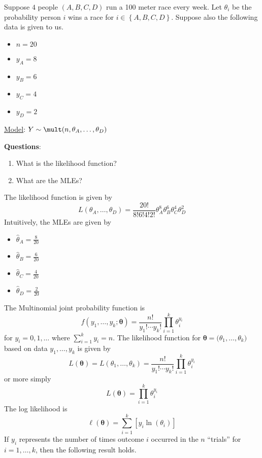 \begin{Example}{}{}
    Suppose $ 4 $ people $ (A,B,C,D) $ run a 100 meter race every week.
    Let $ \theta_i $ be the probability person $ i $ wins a race for
    $ i\in\left\{ A,B,C,D\right\} $.
    Suppose also the following data is given to us.
    \begin{itemize}
        \item $ n=20 $
        \item $ y_A=8 $
        \item $ y_B=6 $
        \item $ y_C=4 $
        \item $ y_D=2 $
    \end{itemize}
    \underline{Model}: $ Y \sim \mult(n,\theta_A,\ldots ,\theta_D) $

    \textbf{Questions}:
    \begin{enumerate}[label=(\alph*)]
        \item What is the likelihood function?
        \item What are the MLEs?
    \end{enumerate}
    The likelihood function is given by
    \[ L(\theta_A,\ldots ,\theta_D)=\frac{20!}{8!6!4!2!} \theta_A^8\theta_B^6\theta_C^4\theta_D^2 \]
    Intuitively, the MLEs are given by
    \begin{itemize}
        \item $ \hat{\theta}_A=\frac{8}{20} $
        \item $ \hat{\theta}_B=\frac{6}{20} $
        \item $ \hat{\theta}_C=\frac{4}{20} $
        \item $ \hat{\theta}_D=\frac{2}{20} $
    \end{itemize}
\end{Example}


The Multinomial joint probability function is
\[ f(y_1,\ldots ,y_k;\symbf{\theta})=\frac{n!}{y_1!\cdots y_k!}\prod_{i=1}^k \theta_i^{y_i} \]
for $ y_i=0,1,\ldots $ where $ \sum\limits_{i=1}^{k} y_i = n $.
The likelihood function for $ \symbf{\theta}=\symbf(\theta_1,\ldots ,\theta_k) $ based on data
$ y_1,\ldots ,y_k $ is given by
\[ L(\symbf{\theta})=L(\theta_1,\ldots ,\theta_k)=\frac{n!}{y_1!\cdots y_k!} \prod_{i=1}^k
    \theta_i^{y_i} \]
or more simply
\[ L(\symbf{\theta})=\prod_{i=1}^k \theta_i^{y_i} \]
The log likelihood is
\[ \ell(\symbf{\theta})=\sum\limits_{i=1}^{k} \left[ y_i\ln(\theta_i) \right] \]
If $ y_i $ represents the number of times outcome $ i $ occurred in the $ n $ ``trials''
for $ i=1,\ldots ,k $, then the following result holds.

